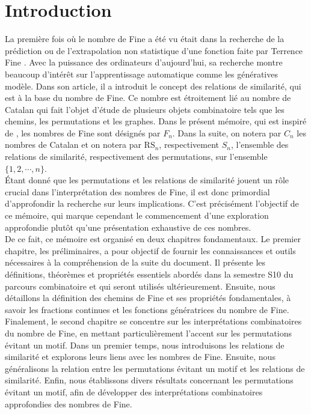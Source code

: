 \section*{Introduction}
\vspace*{20pt}
La première fois où le nombre de Fine a été vu était dans la recherche de la prédiction ou de l'extrapolation non statistique d'une fonction faite par Terrence Fine \cite{TFine}. Avec la puissance des ordinateurs d'aujourd'hui, sa recherche montre beaucoup d'intérêt sur l'apprentissage automatique comme les génératives modèle. Dans son article, il a introduit le concept des relations de similarité, qui est à la base du nombre de Fine.
Ce nombre est étroitement lié au nombre de Catalan qui fait l'objet d'étude de plusieurs objets combinatoire tels que les chemins, les permutations et les graphes. Dans le présent mémoire, qui est inspiré de \cite{RRP}, les nombres de Fine sont désignés par $F_{n}$. Dans la suite, on notera par $C_{n}$ les nombres de Catalan et on notera par $\text{RS}_{n}$, respectivement $S_{n}$, l'ensemble des relations de similarité, respectivement des permutations, sur l'ensemble $\{1, 2, \cdots, n\}$.\vspace{5pt}\\

Étant donné que les permutations et les relations de similarité jouent un rôle crucial dans l'interprétation des nombres de Fine, il est donc primordial d'approfondir la recherche sur leurs implications. C'est précisément l'objectif de ce mémoire, qui marque cependant le commencement d'une exploration approfondie plutôt qu'une présentation exhaustive de ces nombres. \vspace{5pt}\\

De ce fait, ce mémoire est organisé en deux chapitres fondamentaux. Le premier chapitre, les préliminaires, a pour objectif de fournir les connaissances et outils nécessaires à la compréhension de la suite du document. Il présente les définitions, théorèmes et propriétés essentiels abordés dans la semestre S10 du parcours combinatoire et qui seront utilisés ultérieurement. Ensuite, nous détaillons la définition des chemins de Fine et ses propriétés fondamentales, à savoir les fractions continues et les fonctions génératrices du nombre de Fine. \vspace*{5pt}\\

Finalement, le second chapitre se concentre sur les interprétations combinatoires du nombre de Fine, en mettant particulièrement l'accent sur les permutations évitant un motif. Dans un premier temps, nous introduisons les relations de similarité et explorons leurs liens avec les nombres de Fine. Ensuite, nous généralisons la relation entre les permutations évitant un motif et les relations de similarité. Enfin, nous établissons divers résultats concernant les permutations évitant un motif, afin de développer des interprétations combinatoires approfondies des nombres de Fine.\\
\newpage

